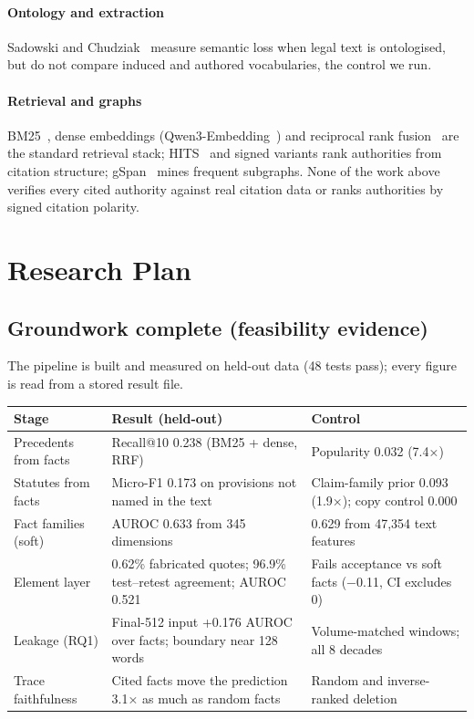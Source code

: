 \documentclass[12pt,a4paper]{article}
\newcommand{\hdr}{\rowcolor{band}}
\begin{document}
\paragraph{Ontology and extraction} Sadowski and Chudziak~\cite{sadowski} measure semantic loss when
legal text is ontologised, but do not compare induced and authored vocabularies, the control we run.
\paragraph{Retrieval and graphs} BM25~\cite{bm25}, dense embeddings (Qwen3-Embedding~\cite{qwen3})
and reciprocal rank fusion~\cite{rrf} are the standard retrieval stack; HITS~\cite{hits} and signed
variants rank authorities from citation structure; gSpan~\cite{gspan} mines frequent subgraphs. None of the work above verifies every cited
authority against real citation data or ranks authorities by signed citation polarity.

\section{Research Plan}
\subsection{Groundwork complete (feasibility evidence)}
The pipeline is built and measured on held-out data (48 tests pass); every figure is read from a stored result file.

\begin{tabularx}{\textwidth}{@{}P{3.6cm}Y Y@{}}
\toprule
\hdr \textbf{Stage} & \textbf{Result (held-out)} & \textbf{Control} \\
\midrule
Precedents from facts & Recall@10 0.238 (BM25 + dense, RRF) & Popularity 0.032 (7.4×) \\
Statutes from facts & Micro-F1 0.173 on provisions not named in the text & Claim-family prior 0.093 (1.9×); copy control 0.000 \\
Fact families (soft) & AUROC 0.633 from 345 dimensions & 0.629 from 47,354 text features \\
Element layer & 0.62\% fabricated quotes; 96.9\% test--retest agreement; AUROC 0.521 & Fails acceptance vs soft facts (−0.11, CI excludes 0) \\
Leakage (RQ1) & Final-512 input +0.176 AUROC over facts; boundary near 128 words & Volume-matched windows; all 8 decades \\
Trace faithfulness & Cited facts move the prediction 3.1× as much as random facts & Random and inverse-ranked deletion \\
\bottomrule
\end{tabularx}
\end{document}
